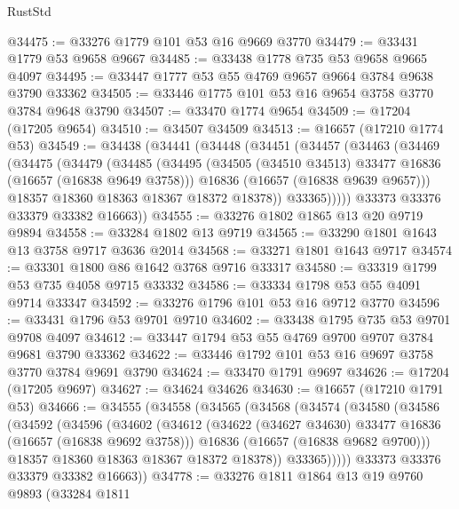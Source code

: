 \begin{lexlean}{RustStd}
\begin{coremodule}
@34475 := @33276 @1779 @101 @53 @16 @9669 @3770
@34479 := @33431 @1779 @53 @9658 @9667
@34485 := @33438 @1778 @735 @53 @9658 @9665 @4097
@34495 := @33447 @1777 @53 @55 @4769 @9657 @9664 @3784 @9638 @3790 @33362
@34505 := @33446 @1775 @101 @53 @16 @9654 @3758 @3770 @3784 @9648 @3790
@34507 := @33470 @1774 @9654
@34509 := @17204 (@17205 @9654)
@34510 := @34507 @34509
@34513 := @16657 (@17210 @1774 @53)
@34549 := @34438
    (@34441
      (@34448
        (@34451
          (@34457
            (@34463
              (@34469
                (@34475
                  (@34479
                    (@34485
                      (@34495
                        (@34505 (@34510 @34513) @33477 @16836 (@16657 (@16838 @9649 @3758)))
                        @16836
                        (@16657 (@16838 @9639 @9657)))
                      @18357
                      @18360
                      @18363
                      @18367
                      @18372
                      @18378))
                  @33365)))))
        @33373
        @33376
        @33379
        @33382
        @16663))
@34555 := @33276 @1802 @1865 @13 @20 @9719 @9894
@34558 := @33284 @1802 @13 @9719
@34565 := @33290 @1801 @1643 @13 @3758 @9717 @3636 @2014
@34568 := @33271 @1801 @1643 @9717
@34574 := @33301 @1800 @86 @1642 @3768 @9716 @33317
@34580 := @33319 @1799 @53 @735 @4058 @9715 @33332
@34586 := @33334 @1798 @53 @55 @4091 @9714 @33347
@34592 := @33276 @1796 @101 @53 @16 @9712 @3770
@34596 := @33431 @1796 @53 @9701 @9710
@34602 := @33438 @1795 @735 @53 @9701 @9708 @4097
@34612 := @33447 @1794 @53 @55 @4769 @9700 @9707 @3784 @9681 @3790 @33362
@34622 := @33446 @1792 @101 @53 @16 @9697 @3758 @3770 @3784 @9691 @3790
@34624 := @33470 @1791 @9697
@34626 := @17204 (@17205 @9697)
@34627 := @34624 @34626
@34630 := @16657 (@17210 @1791 @53)
@34666 := @34555
    (@34558
      (@34565
        (@34568
          (@34574
            (@34580
              (@34586
                (@34592
                  (@34596
                    (@34602
                      (@34612
                        (@34622 (@34627 @34630) @33477 @16836 (@16657 (@16838 @9692 @3758)))
                        @16836
                        (@16657 (@16838 @9682 @9700)))
                      @18357
                      @18360
                      @18363
                      @18367
                      @18372
                      @18378))
                  @33365)))))
        @33373
        @33376
        @33379
        @33382
        @16663))
@34778 := @33276
    @1811
    @1864
    @13
    @19
    @9760
    @9893
    (@33284
      @1811

\end{coremodule}
\end{lexlean}
